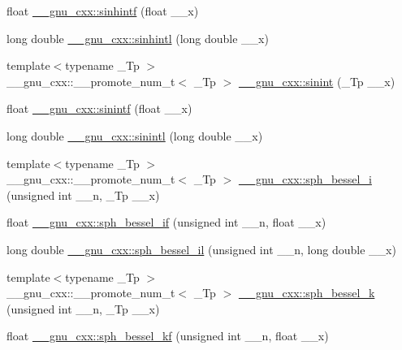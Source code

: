 \begin{DoxyCompactItemize}
\item 
float \hyperlink{group__gnu__math__spec__func_ga375ca3ceb1eafd678e298d0aea4bb3e6}{\+\_\+\+\_\+gnu\+\_\+cxx\+::sinhintf} (float \+\_\+\+\_\+x)
\item 
long double \hyperlink{group__gnu__math__spec__func_ga8b7f1a070be7233a3179e3cbded387ee}{\+\_\+\+\_\+gnu\+\_\+cxx\+::sinhintl} (long double \+\_\+\+\_\+x)
\item 
{\footnotesize template$<$typename \+\_\+\+Tp $>$ }\\\+\_\+\+\_\+gnu\+\_\+cxx\+::\+\_\+\+\_\+promote\+\_\+num\+\_\+t$<$ \+\_\+\+Tp $>$ \hyperlink{group__gnu__math__spec__func_ga4b0807985bd194392fc7d7abe4cf2c61}{\+\_\+\+\_\+gnu\+\_\+cxx\+::sinint} (\+\_\+\+Tp \+\_\+\+\_\+x)
\item 
float \hyperlink{group__gnu__math__spec__func_ga8b63406fec50d7e00470521b82fb32a2}{\+\_\+\+\_\+gnu\+\_\+cxx\+::sinintf} (float \+\_\+\+\_\+x)
\item 
long double \hyperlink{group__gnu__math__spec__func_ga3ff83e5c5f1435064b6942ca8b7c8779}{\+\_\+\+\_\+gnu\+\_\+cxx\+::sinintl} (long double \+\_\+\+\_\+x)
\item 
{\footnotesize template$<$typename \+\_\+\+Tp $>$ }\\\+\_\+\+\_\+gnu\+\_\+cxx\+::\+\_\+\+\_\+promote\+\_\+num\+\_\+t$<$ \+\_\+\+Tp $>$ \hyperlink{group__gnu__math__spec__func_ga93454a071a189f7cc9e79078526aa3fd}{\+\_\+\+\_\+gnu\+\_\+cxx\+::sph\+\_\+bessel\+\_\+i} (unsigned int \+\_\+\+\_\+n, \+\_\+\+Tp \+\_\+\+\_\+x)
\item 
float \hyperlink{group__gnu__math__spec__func_gacc6738f18c1ba19452b9dd814d11c00c}{\+\_\+\+\_\+gnu\+\_\+cxx\+::sph\+\_\+bessel\+\_\+if} (unsigned int \+\_\+\+\_\+n, float \+\_\+\+\_\+x)
\item 
long double \hyperlink{group__gnu__math__spec__func_gaf4392d9ed177913febdcbfccb947dbca}{\+\_\+\+\_\+gnu\+\_\+cxx\+::sph\+\_\+bessel\+\_\+il} (unsigned int \+\_\+\+\_\+n, long double \+\_\+\+\_\+x)
\item 
{\footnotesize template$<$typename \+\_\+\+Tp $>$ }\\\+\_\+\+\_\+gnu\+\_\+cxx\+::\+\_\+\+\_\+promote\+\_\+num\+\_\+t$<$ \+\_\+\+Tp $>$ \hyperlink{group__gnu__math__spec__func_ga737e6fe2f7f4acb6fcc6bccfe2a4c254}{\+\_\+\+\_\+gnu\+\_\+cxx\+::sph\+\_\+bessel\+\_\+k} (unsigned int \+\_\+\+\_\+n, \+\_\+\+Tp \+\_\+\+\_\+x)
\item 
float \hyperlink{group__gnu__math__spec__func_gaf886e8f8dfd2af0c4a9c5929d193d12f}{\+\_\+\+\_\+gnu\+\_\+cxx\+::sph\+\_\+bessel\+\_\+kf} (unsigned int \+\_\+\+\_\+n, float \+\_\+\+\_\+x)

\end{DoxyCompactItemize}
